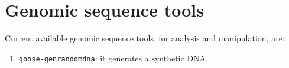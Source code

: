 \chapter{Genomic sequence tools}
\label{gst}

Current available genomic sequence tools, for analysis and manipulation, are:
\begin{enumerate}
\item \texttt{goose-genrandomdna}: it generates a synthetic DNA.
\end{enumerate}



%
%
%
%